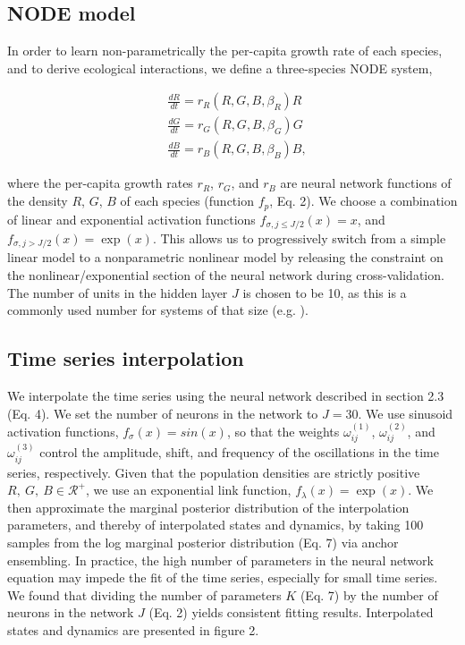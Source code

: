 \documentclass[11pt, oneside]{article}
\begin{document}
\subsection{NODE model}

In order to learn non-parametrically the per-capita growth rate of each species, and to derive ecological interactions, we define a three-species NODE system,

\vspace{-0.5cm}
\begin{equation} \begin{aligned}
	& \frac{dR}{dt} = r_R(R,G,B,\beta_R) R \\
	& \frac{dG}{dt} = r_G(R,G,B,\beta_G) G \\
	& \frac{dB}{dt} = r_B(R,G,B,\beta_B) B,
\end{aligned} \end{equation}

where the per-capita growth rates $r_R$, $r_G$, and $r_B$ are neural network functions of the density $R$, $G$, $B$ of each species (function $f_p$, Eq. 2).
We choose a combination of linear and exponential activation functions $f_{\sigma, j\leq J/2}(x) = x$, and $f_{\sigma, j>J/2}(x) = \exp(x)$.
This allows us to progressively switch from a simple linear model to a nonparametric nonlinear model by releasing the constraint on the nonlinear/exponential section of the neural network during cross-validation.
The number of units in the hidden layer $J$ is chosen to be 10, as this is a commonly used number for systems of that size (e.g. \cite{Wu2005}). 

\subsection{Time series interpolation}

We interpolate the time series using the neural network described in section 2.3 (Eq. 4).
We set the number of neurons in the network to $J=30$.
We use sinusoid activation functions, $f_\sigma(x) = sin(x)$, so that the weights $\omega^{(1)}_{ij}$, $\omega^{(2)}_{ij}$, and $\omega^{(3)}_{ij}$ control the amplitude, shift, and frequency of the oscillations in the time series, respectively.
Given that the population densities are strictly positive $R,~G,~B \in \mathcal{R^{+}}$, we use an exponential link function, $f_\lambda(x) = \exp (x)$. 
We then approximate the marginal posterior distribution of the interpolation parameters, and thereby of interpolated states and dynamics, by taking 100 samples from the log marginal posterior distribution (Eq. 7) via anchor ensembling. %
In practice, the high number of parameters in the neural network equation may impede the fit of the time series, especially for small time series. 
We found that dividing the number of parameters $K$ (Eq. 7) by the number of neurons in the network $J$ (Eq. 2) yields consistent fitting results.
Interpolated states and dynamics are presented in figure 2.
\end{document}
